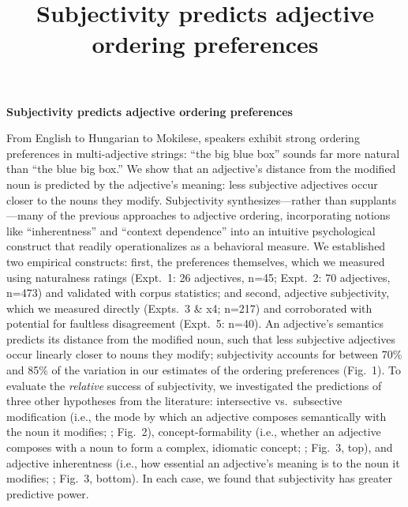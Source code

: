 \documentclass[10pt]{article}
\title{Subjectivity predicts adjective ordering preferences}
\begin{document}

\begin{center}
	\textbf{Subjectivity predicts adjective ordering preferences}
\end{center}
From English to Hungarian to Mokilese, speakers exhibit strong ordering preferences in multi-adjective strings: ``the big blue box'' sounds far more natural than ``the blue big box.'' We show that an adjective's distance from the modified noun is predicted by the adjective's meaning: less subjective adjectives occur closer to the nouns they modify.  
Subjectivity synthesizes---rather than supplants---many of the previous approaches to adjective ordering, incorporating notions like ``inherentness'' and ``context dependence'' into an intuitive psychological construct that readily operationalizes as a behavioral measure. 
	We established two empirical constructs: first, the preferences themselves, which we measured using naturalness ratings (Expt.~1: 26 adjectives, n=45; Expt.~2: 70 adjectives, n=473) and validated with corpus statistics; and second, adjective subjectivity, which we measured directly (Expts.~3 \& x4; n=217) and corroborated with potential for faultless disagreement (Expt.~5: n=40). 
An adjective's semantics predicts its distance from the modified noun, such that less subjective adjectives occur linearly closer to nouns they modify; subjectivity accounts for between 70\% and 85\% of the variation in our estimates of the ordering preferences (Fig.~1). %
To evaluate the \emph{relative} success of subjectivity, we investigated the predictions of three other hypotheses from the literature: intersective vs.~subsective modification (i.e., the mode by which an adjective composes semantically with the noun it modifies; \citealp{truswell2009}; Fig.~2), concept-formability (i.e., whether an adjective composes with a noun to form a complex, idiomatic concept; \citealp{McNally2004,bouchard2005,svenonius2008}; Fig.~3, top), and adjective inherentness (i.e., how essential an adjective's meaning is to the noun it modifies; \citealp{sweet1898,whorf1945}; Fig.~3, bottom). In each case, we found that subjectivity has greater predictive power. 
\noindent 
\end{document}
